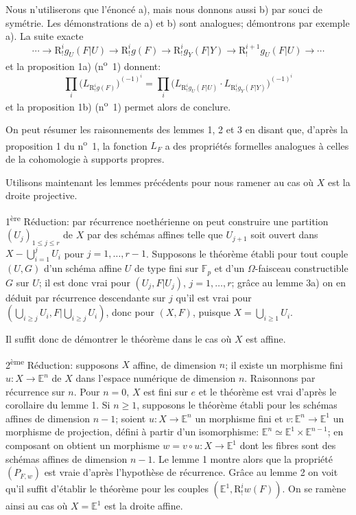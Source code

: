 Nous n'utiliserons que l'énoncé a), mais nous donnons aussi b) par souci de symétrie. Les démonstrations de a) et b) sont analogues; démontrons par exemple a). La suite exacte
\[
\cdots\longrightarrow \mathrm{R}^i_!g_U(F|U)\longrightarrow \mathrm{R}^i_!g(F)
\longrightarrow \mathrm{R}^i_!g_Y(F|Y)\longrightarrow \mathrm{R}^{i+1}_!g_U(F|U)\longrightarrow\cdots
\]
et la proposition 1a) (n\textsuperscript{o}~1) donnent:
\[
\prod_i\bigl(L_{\mathrm{R}^i_!g(F)}\bigr)^{(-1)^i}
=\prod_i\bigl(L_{\mathrm{R}^i_!g_U(F|U)}\cdot L_{\mathrm{R}^i_!g_Y(F|Y)}\bigr)^{(-1)^i}
\]
et la proposition 1b) (n\textsuperscript{o}~1) permet alors de conclure.

On peut résumer les raisonnements des lemmes 1, 2 et 3 en disant que, d'après la proposition 1 du n\textsuperscript{o}~1, la fonction $L_F$ a des propriétés formelles analogues à celles de la cohomologie à supports 
propres.

Utilisons maintenant les lemmes précédents pour nous ramener au cas où $X$ est la droite projective.

1\textsuperscript{ère} Réduction: par récurrence noethérienne on peut construire une partition $(U_j)_{1\le j\le r}$ de $X$ par des schémas affines telle que $U_{j+1}$ soit ouvert dans $X-\bigcup_{i=1}^jU_i$ pour $j=1,\ldots,r-1$. Supposons le théorème établi pour tout couple $(U,G)$ d'un schéma affine $U$ de type fini sur $\mathbb{F}_p$ et d'un $\Omega$-faisceau constructible $G$ sur $U$; il est donc vrai pour $(U_j,F|U_j)$, $j=1,\ldots,r$; grâce au lemme 3a) on en déduit par récurrence descendante sur $j$ qu'il est vrai pour $(\bigcup_{i\ge j}U_i,F|\bigcup_{i\ge j}U_i)$, donc pour $(X,F)$, puisque $X=\bigcup_{i\ge1}U_i$.

Il suffit donc de démontrer le théorème dans le cas où $X$ est affine.

2\textsuperscript{ème} Réduction: supposons $X$ affine, de dimension $n$; il existe un morphisme fini $u:X\to\mathbb{E}^n$ de $X$ dans l'espace numérique de dimension $n$. Raisonnons par récurrence sur $n$. Pour $n=0$, $X$ est fini sur $e$ et le théorème est vrai d'après le corollaire du lemme 1. Si $n\ge1$, supposons le théorème établi pour les schémas affines de dimension $n-1$; soient $u:X\to\mathbb{E}^n$ un morphisme fini et $v:\mathbb{E}^n\to\mathbb{E}^1$ un morphisme de projection, défini à partir d'un isomorphisme: $\mathbb{E}^n\simeq\mathbb{E}^1\times\mathbb{E}^{n-1}$; en composant on obtient un morphisme $w=v\circ u:X\to\mathbb{E}^1$ dont les fibres sont des schémas affines de dimension $n-1$. Le lemme 1 montre alors que la propriété $(P_{F,w})$ est vraie d'après l'hypothèse de récurrence. Grâce au lemme 2 on voit qu'il suffit d'établir le théorème pour les couples 
$(\mathbb{E}^1,\mathrm{R}^i_!w(F))$. On se ramène
ainsi au cas où $X=\mathbb{E}^1$ est la droite affine.

